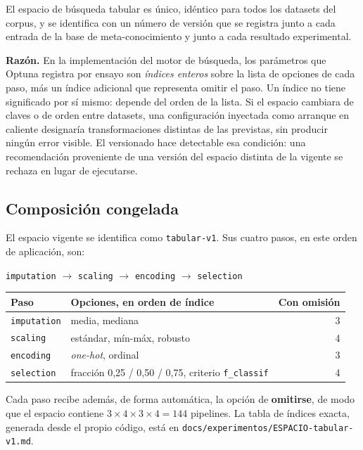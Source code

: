 \documentclass[11pt,letterpaper]{article}
\begin{document}
El espacio de búsqueda tabular es único, idéntico para todos los datasets del
corpus, y se identifica con un número de versión que se registra junto a cada
entrada de la base de meta-conocimiento y junto a cada resultado experimental.

\textbf{Razón.} En la implementación del motor de búsqueda, los parámetros que
Optuna registra por ensayo son \emph{índices enteros} sobre la lista de opciones
de cada paso, más un índice adicional que representa omitir el paso. Un índice no
tiene significado por sí mismo: depende del orden de la lista. Si el espacio
cambiara de claves o de orden entre datasets, una configuración inyectada como
arranque en caliente designaría transformaciones distintas de las previstas, sin
producir ningún error visible. El versionado hace detectable esa condición:
una recomendación proveniente de una versión del espacio distinta de la vigente
se rechaza en lugar de ejecutarse.

\subsection{Composición congelada}

El espacio vigente se identifica como \texttt{tabular-v1}. Sus cuatro pasos, en
este orden de aplicación, son:

\begin{center}
\texttt{imputation} $\rightarrow$ \texttt{scaling} $\rightarrow$
\texttt{encoding} $\rightarrow$ \texttt{selection}
\end{center}

\begin{center}
\begin{tabularx}{0.92\textwidth}{L{2.6cm} Y r}
\toprule
{} \textbf{Paso} & \textbf{Opciones, en orden de índice} & \textbf{Con omisión} \\
\midrule
\texttt{imputation} & media, mediana & 3 \\
\texttt{scaling} & estándar, mín-máx, robusto & 4 \\
\texttt{encoding} & \textit{one-hot}, ordinal & 3 \\
\texttt{selection} & fracción 0,25 / 0,50 / 0,75, criterio \texttt{f\_classif} & 4 \\
\bottomrule
\end{tabularx}
\end{center}

Cada paso recibe además, de forma automática, la opción de \textbf{omitirse}, de
modo que el espacio contiene $3 \times 4 \times 3 \times 4 = 144$ pipelines. La
tabla de índices exacta, generada desde el propio código, está en
\texttt{docs/experimentos/ESPACIO-tabular-v1.md}.
\end{document}
